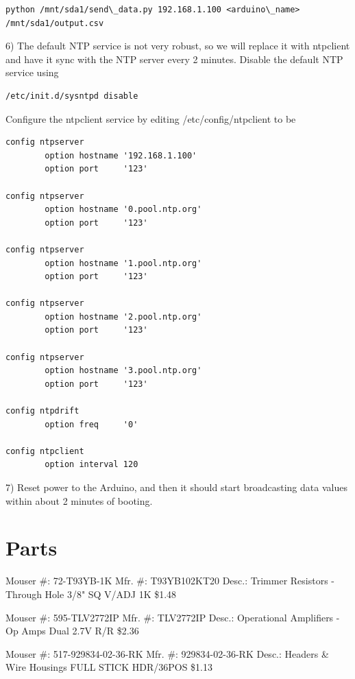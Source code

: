 \documentclass[11pt,oneside]{book}
\begin{document}
\begin{verbatim}
python /mnt/sda1/send\_data.py 192.168.1.100 <arduino\_name> /mnt/sda1/output.csv
\end{verbatim}

6) The default NTP service is not very robust, so we will replace it with ntpclient and have it sync with the NTP server every 2 minutes. Disable the default NTP service using

\begin{verbatim}
/etc/init.d/sysntpd disable
\end{verbatim}

Configure the ntpclient service by editing /etc/config/ntpclient to be

\begin{verbatim}
config ntpserver
        option hostname '192.168.1.100'
        option port     '123'

config ntpserver
        option hostname '0.pool.ntp.org'
        option port     '123'

config ntpserver
        option hostname '1.pool.ntp.org'
        option port     '123'

config ntpserver
        option hostname '2.pool.ntp.org'
        option port     '123'

config ntpserver
        option hostname '3.pool.ntp.org'
        option port     '123'

config ntpdrift                                 
        option freq     '0'                     
                                                
config ntpclient                                
        option interval 120
\end{verbatim}

7) Reset power to the Arduino, and then it should start broadcasting data values within about 2 minutes of booting.

\section{Parts}

Mouser \#: 72-T93YB-1K 
Mfr. \#: T93YB102KT20
Desc.:  Trimmer Resistors - Through Hole 3/8" SQ V/ADJ 1K
\$1.48

Mouser \#:   595-TLV2772IP   
Mfr. \#: TLV2772IP
Desc.:  Operational Amplifiers - Op Amps Dual 2.7V R/R
\$2.36

Mouser \#:   517-929834-02-36-RK 
Mfr. \#: 929834-02-36-RK
Desc.: Headers \& Wire Housings FULL STICK HDR/36POS
\$1.13
\end{document}
